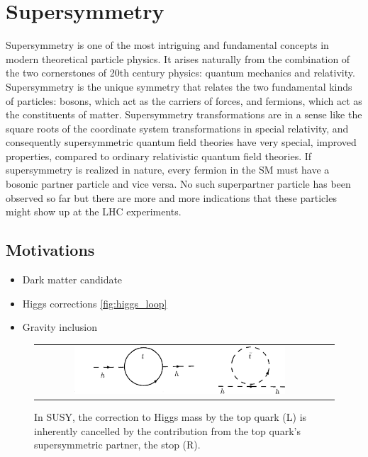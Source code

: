 \clearpage

\section{Supersymmetry}

Supersymmetry is one of the most intriguing and fundamental concepts in modern theoretical particle physics. It arises naturally from the combination of the two cornerstones of 20th century physics: quantum mechanics and relativity. Supersymmetry is the unique symmetry that relates the two fundamental kinds of particles: bosons, which act as the carriers of forces, and fermions, which act as the constituents of matter. Supersymmetry transformations are in a sense like the square roots of the coordinate system transformations in special relativity, and consequently supersymmetric quantum field theories have very special, improved properties, compared to ordinary relativistic quantum field theories. If supersymmetry is realized in nature, every fermion in the SM must have a bosonic partner particle and vice versa. No such superpartner particle has been observed so far but there are more and more indications that these particles might show up at the LHC experiments.


\subsection{Motivations}

\begin{itemize}
	\item Dark matter candidate
	\item Higgs corrections \autoref{fig:higgs_loop}
	\item Gravity inclusion
\end{itemize}

\begin{figure}[tbh!]
	\centering
	\begin{tabular}{cc}
		\includegraphics[width=0.75\textwidth]{theory/pics/higgs_loop.png}
	\end{tabular}
	\caption{In SUSY, the correction to Higgs mass by the top quark (L) is inherently cancelled by the contribution from the top quark's supersymmetric partner, the stop (R).}
	\label{fig:higgs_loop}
\end{figure}


